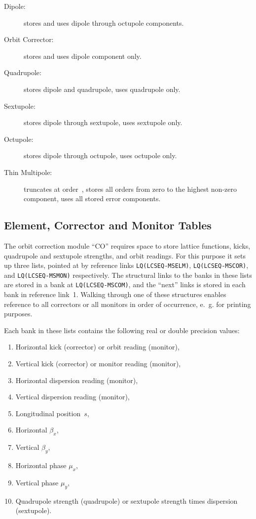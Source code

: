 \begin{description}
\item[Dipole:]
stores and uses dipole through octupole components.
\item[Orbit Corrector:]
stores and uses dipole component only.
\item[Quadrupole:]
stores dipole and quadrupole, uses quadrupole only.
\item[Sextupole:]
stores dipole through sextupole, uses sextupole only.
\item[Octupole:]
stores dipole through octupole, uses octupole only.
\item[Thin Multipole:]
truncates at order~,
stores all orders from zero to the highest non-zero component,
uses all stored error components.
\end{description}
 
\subsection{Element, Corrector and Monitor Tables}
\label{Scorr}
The orbit correction module ``CO'' requires space to store lattice
functions, kicks, quadrupole and sextupole strengths, and orbit
readings.
For this purpose it sets up three lists, pointed at by reference links
{\tt LQ(LCSEQ-MSELM)}, {\tt LQ(LCSEQ-MSCOR)}, and
{\tt LQ(LCSEQ-MSMON)} respectively.
The structural links to the banks in these lists are stored in a bank
at {\tt LQ(LCSEQ-MSCOM)},
and the ``next'' links is stored in each bank in reference link~1.
Walking through one of these structures enables reference to all correctors
or all monitors in order of occurrence, e.~g. for printing purposes.
 
Each bank in these lists contains the following real or double
precision values:
\begin{enumerate}
\item
Horizontal kick (corrector) or orbit reading (monitor),
\item
Vertical kick (corrector) or monitor reading (monitor),
\item
Horizontal dispersion reading (monitor),
\item
Vertical dispersion reading (monitor),
\item
Longitudinal position~$s$,
\item
Horizontal $\beta_x$,
\item
Vertical $\beta_y$,
\item
Horizontal phase $\mu_x$,
\item
Vertical phase $\mu_y$,
\item
Quadrupole strength (quadrupole) or sextupole strength times
dispersion (sextupole).
\end{enumerate}

